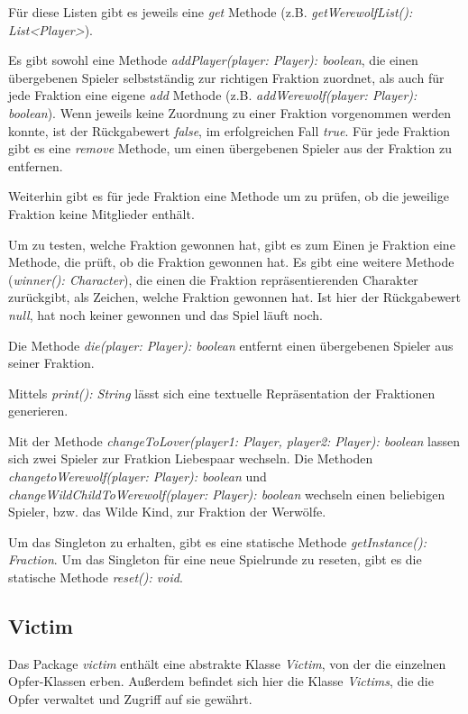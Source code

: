 \medskip
Für diese Listen gibt es jeweils eine \textit{get} Methode (z.B. \textit{getWerewolfList(): List<Player>}). 

\medskip
Es gibt sowohl eine Methode \textit{addPlayer(player: Player): boolean}, die einen übergebenen Spieler selbstständig zur richtigen Fraktion zuordnet, als auch für jede Fraktion eine eigene \textit{add} Methode (z.B. \textit{addWerewolf(player: Player): boolean}). Wenn jeweils keine Zuordnung zu einer Fraktion vorgenommen werden konnte, ist der Rückgabewert \textit{false}, im erfolgreichen Fall \textit{true}. Für jede Fraktion gibt es eine \textit{remove} Methode, um einen übergebenen Spieler aus der Fraktion zu entfernen. 

\medskip
Weiterhin gibt es für jede Fraktion eine Methode um zu prüfen, ob die jeweilige Fraktion keine Mitglieder enthält.

\medskip
Um zu testen, welche Fraktion gewonnen hat, gibt es zum Einen je Fraktion eine Methode, die prüft, ob die Fraktion gewonnen hat. Es gibt eine weitere Methode (\textit{winner(): Character}), die einen die Fraktion repräsentierenden Charakter zurückgibt, als Zeichen, welche Fraktion gewonnen hat. Ist hier der Rückgabewert \textit{null}, hat noch keiner gewonnen und das Spiel läuft noch. 

\medskip
Die Methode \textit{die(player: Player): boolean} entfernt einen übergebenen Spieler aus seiner Fraktion. 

\medskip
Mittels \textit{print(): String} lässt sich eine textuelle Repräsentation der Fraktionen generieren. 

\medskip
Mit der Methode \textit{changeToLover(player1: Player, player2: Player): boolean} lassen sich zwei Spieler zur Fratkion Liebespaar wechseln.
Die Methoden \textit{changetoWerewolf(player: Player): boolean} und \textit{changeWildChildToWerewolf(player: Player): boolean} wechseln einen beliebigen Spieler, bzw. das Wilde Kind, zur Fraktion der Werwölfe. 

\medskip
Um das Singleton zu erhalten, gibt es eine statische Methode \textit{getInstance(): Fraction}. 
Um das Singleton für eine neue Spielrunde zu reseten, gibt es die statische Methode \textit{reset(): void}. 

\subsection{Victim}

Das Package \textit{victim} enthält eine abstrakte Klasse \textit{Victim}, von der die einzelnen Opfer-Klassen erben. Außerdem befindet sich hier die Klasse \textit{Victims}, die die Opfer verwaltet und Zugriff auf sie gewährt. 

